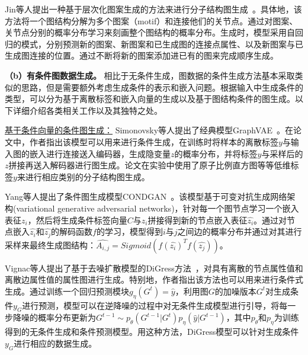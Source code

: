 Jin等人提出一种基于层次化图案生成的方法来进行分子结构图生成~\cite{jin2020hierarchical}。具体地，该方法将一个图结构分解为多个图案（motif）和连接他们的关节点。通过对图案、关节点分别的概率分布学习来刻画整个图结构的概率分布。生成时，模型采用自回归的模式，分别预测新的图案、新图案和已生成图的连接点属性、以及新图案与已生成图连接的位置。通过不断将新的图案添加进已有的图来完成顺序生成。


\textbf{（b）有条件图数据生成。} 
相比于无条件生成，图数据的条件生成方法基本采取类似的思路，但是需要额外考虑生成条件的表示和嵌入问题。根据输入中生成条件的类型，可以分为基于离散标签和嵌入向量的生成以及基于图结构条件的图生成。以下详细介绍各类相关工作以及其独特之处。 

\underline{基于条件向量的条件图生成：} Simonovsky等人提出了经典模型GraphVAE~\cite{simonovsky2018graphvae}。在论文中，作者指出该模型可以用来进行条件生成，在训练时将样本的离散标签$y$与输入图的嵌入进行连接送入编码器，生成隐变量$z$的概率分布，并将标签$y$与采样后的$z$拼接再送入解码器进行图生成。论文在实验中使用了原子比例直方图等等低维标签$y$来进行相应类别的分子结构图生成。

Yang等人提出了条件图生成模型CONDGAN~\cite{yang2019conditional}。该模型基于可变对抗生成网络架构(variational generative adversarial networks)，针对每一个图节点学习一个嵌入表征$z_i$，然后将生成条件标签向量$C$与$z_i$拼接得到新的节点嵌入表征$\hat{z_i}$。通过对节点嵌入$\hat{z_i}$和$\hat{z_j}$的解码函数$f$的学习，模型得到$i$与$j$之间边的概率分布并通过对其进行采样来最终生成图结构：$\hat{A_{i,j}} = Sigmoid(f(\hat{z_i})^Tf(\hat{z_j}))$。

Vignac等人提出了基于去噪扩散模型的DiGress方法~\cite{vignac2022digress}，对具有离散的节点属性值和离散边属性值的属性图进行生成。特别地，作者指出该方法也可以用来进行条件式生成。通过训练一个回归预测模块$g_\eta(G^t) = \hat{y}$，利用图$G$的加噪版本$G^t$对生成条件$y_G$进行预测，模型可以在逆降噪的过程中对无条件生成模型进行引导，将每一步降噪的概率分布更新为$G^{t-1}\sim p_\theta(G^{t-1}|G^t)p_\eta(\hat{y}|G^{t-1})$，其中$p_\theta$和$p_\eta$为训练得到的无条件生成和条件预测模型。用这种方法，DiGress模型可以针对生成条件$y_G$进行相应的数据生成。
%

